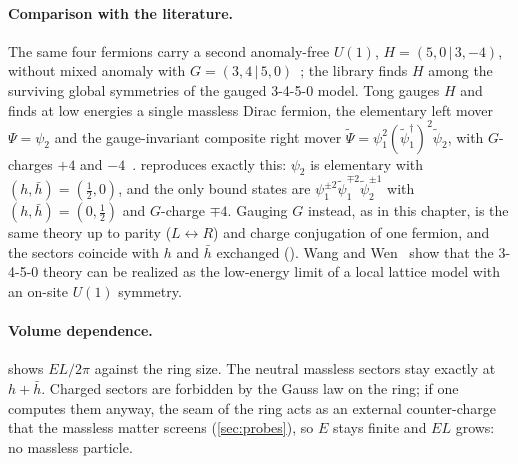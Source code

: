 
\paragraph{Comparison with the literature.} The same four fermions carry a second anomaly-free $U(1)$,
$H = (5,0\,|\,3,-4)$, without mixed anomaly with $G = (3,4\,|\,5,0)$~\cite{Tong2022}; the library finds $H$ among the
surviving global symmetries of the gauged 3-4-5-0 model. Tong gauges $H$ and finds at low energies a single massless
Dirac fermion, the elementary left mover $\Psi = \psi_2$ and the gauge-invariant composite right mover
$\tilde\Psi = \psi_1^2(\tilde\psi_1^\dagger)^2\tilde\psi_2$, with $G$-charges $+4$ and $-4$~\cite{Tong2022}.
 reproduces exactly this: $\psi_2$ is elementary with
$(h,\bar h) = (\frac12,0)$, and the only bound states are $\psi_1^{\pm2}\tilde\psi_1^{\mp2}\tilde\psi_2^{\pm1}$ with
$(h,\bar h) = (0,\frac12)$ and $G$-charge $\mp4$. Gauging $G$ instead, as in this chapter, is the same theory up to
parity ($L\leftrightarrow R$) and charge conjugation of one fermion, and the sectors coincide with $h$ and $\bar h$
exchanged (). Wang and Wen~\cite{WangWen2019} show that the 3-4-5-0 theory can be
realized as the low-energy limit of a local lattice model with an on-site $U(1)$ symmetry.

\paragraph{Volume dependence.}  shows $EL/2\pi$ against the ring size. The
neutral massless sectors stay exactly at $h+\bar h$. Charged sectors are forbidden by the Gauss law on the ring; if
one computes them anyway, the seam of the ring acts as an external counter-charge that the massless matter screens
(\cref{sec:probes}), so $E$ stays finite and $EL$ grows: no massless particle.


